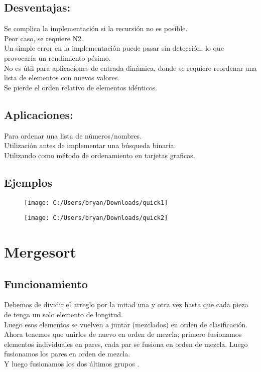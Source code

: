 \documentclass[]{article}
\begin{document}
\subsection{Desventajas:}
Se complica la implementación si la recursión no es posible.\\
Peor caso, se requiere N2.\\
Un simple error en la implementación puede pasar sin detección, lo que provocaría un rendimiento pésimo.\\
No es útil para aplicaciones de entrada dinámica, donde se requiere reordenar una lista de elementos con nuevos valores.\\
Se pierde el orden relativo de elementos idénticos.\\

\subsection{Aplicaciones:}
Para ordenar una lista de números/nombres.\\
Utilización antes de implementar una búsqueda binaria.\\
Utilizando como método de ordenamiento en tarjetas graficas.\\

\subsection{Ejemplos}

\begin{figure}[h]
	\centering
	\texttt{[image: C:/Users/bryan/Downloads/quick1]}
	\caption{}
	\label{fig:quick1}
\end{figure}
\begin{figure}[t!]
	\centering
	\texttt{[image: C:/Users/bryan/Downloads/quick2]}
	\caption{}
	\label{fig:quick2}
\end{figure}

\newpage
\section{Mergesort}

\subsection{Funcionamiento}
Debemos de dividir el arreglo por la mitad una y otra vez hasta que cada pieza de tenga un solo elemento de longitud.\\
Luego esos elementos se vuelven a juntar (mezclados) en orden de clasificación.\\
Ahora tenemos que unirlos de nuevo en orden de mezcla; primero fusionamos elementos individuales en pares, cada par se fusiona en orden de mezcla.
Luego fusionamos los pares en orden de mezcla.\\
Y luego fusionamos los dos últimos grupos .\\
\end{document}

